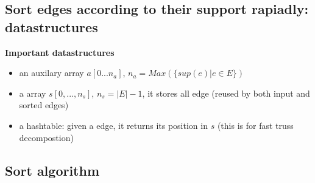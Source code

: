 \documentclass{beamer}
\begin{document}
\subsection{Sort edges according to their support rapiadly: datastructures}
\begin{frame}
	\textbf{Important datastructures}
	\begin{itemize}
		\item  an auxilary array $a[0...n_{a}]$, $n_{a}= Max(\{sup(e)|e\in E\})$
		\item  a array $s[0,...,n_{s}]$, $n_{s}=|E|-1$, it stores all edge (reused by both input and sorted edges)
		\item  a hashtable: given a edge, it returns its position in $s$ (this is for fast truss decompostion)
	\end{itemize}
\end{frame}


\subsection{Sort algorithm}
\begin{frame}
\end{frame}
\end{document}
